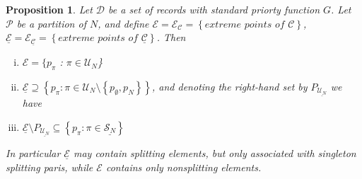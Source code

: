 \documentclass{article}
\newtheorem{prop}{Proposition}
\theoremstyle{case}
\begin{document}
\begin{prop} \label{prop0}
Let $\mathcal{D}$ be a set of records with standard priorty function $G$. Let $\mathcal{P}$ be a partition of $N$, and define $\mathcal{E} = \mathcal{E}_\mathcal{C} = \left\lbrace \textit{extreme points of } \mathcal{C}\right\rbrace$, $\underline{\mathcal{E}} = \mathcal{E}_{\underline{\mathcal{C}}} = \left\lbrace \textit{extreme points of } \underline{\mathcal{C}}\right\rbrace$. Then
\begin{enumerate}[(i)]
	\item $\mathcal{E} = \{p_\pi$ : $\pi \in \mathcal{U}_N$\}
	\item $\underline{\mathcal{E}} \supseteq \left\lbrace p_{\pi} \colon \pi \in \mathcal{U}_N \setminus \left\lbrace p_{\emptyset}, p_N \right\rbrace \right\rbrace$, and denoting the right-hand set by $P_{\underline{\mathcal{U}_N}}$ we have 
	\item $\underline{\mathcal{E}} \setminus P_{\underline{\mathcal{U}_N}} \subseteq \left\lbrace p_{\pi} \colon \pi \in \underline{\mathcal{S}_N} \right\rbrace$
\end{enumerate}
In particular $\underline{\mathcal{E}}$ may contain splitting elements, but only associated with singleton splitting paris, while $\mathcal{E}$ contains only nonsplitting elements.
\end{prop}
\end{document}
